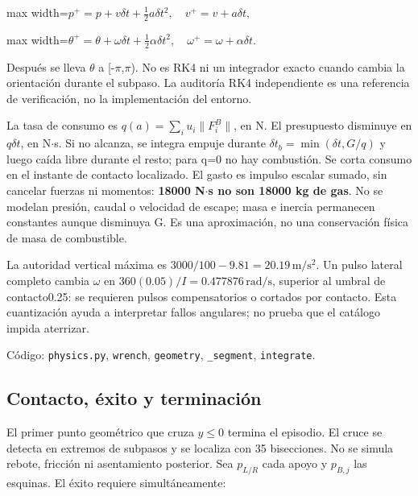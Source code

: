 \documentclass[12pt,a4paper]{article}
\begin{document}
\begin{center}\begin{adjustbox}{max width=\linewidth}$\displaystyle p^+=p+v\delta t+\tfrac12 a\delta t^2,\quad v^+=v+a\delta t,$\end{adjustbox}\end{center}


\begin{center}\begin{adjustbox}{max width=\linewidth}$\displaystyle \theta^+=\theta+\omega\delta t+\tfrac12\alpha\delta t^2,\quad
\omega^+=\omega+\alpha\delta t.$\end{adjustbox}\end{center}



Después se lleva \ensuremath{\theta} a [-\ensuremath{\pi},\allowbreak{}\ensuremath{\pi}). No es RK4 ni un integrador exacto cuando cambia la orientación durante el subpaso. La auditoría RK4 independiente es una referencia de verificación,\allowbreak{} no la implementación del entorno.


La tasa de consumo es $q(a)=\sum_i u_i\|F_i^B\|$,\allowbreak{} en N. El presupuesto disminuye en $q\delta t$,\allowbreak{} en N\ensuremath{\cdot}s. Si no alcanza,\allowbreak{} se integra empuje durante $\delta t_b=\min(\delta t,G/q)$ y luego caída libre durante el resto; para q=0 no hay combustión. Se corta consumo en el instante de contacto localizado. El gasto es impulso escalar sumado,\allowbreak{} sin cancelar fuerzas ni momentos: \textbf{18000 N\ensuremath{\cdot}s no son 18000 kg de gas}. No se modelan presión,\allowbreak{} caudal o velocidad de escape; masa e inercia permanecen constantes aunque disminuya G. Es una aproximación,\allowbreak{} no una conservación física de masa de combustible.


La autoridad vertical máxima es $3000/100-9.81=20.19\,\mathrm{m/s^2}$. Un pulso lateral completo cambia \ensuremath{\omega} en $360(0.05)/I=0.477876\,\mathrm{rad/s}$,\allowbreak{} superior al umbral de contacto0.25: se requieren pulsos compensatorios o cortados por contacto. Esta cuantización ayuda a interpretar fallos angulares; no prueba que el catálogo impida aterrizar.


Código: \textcolor{Accent}{\nolinkurl{physics.py}},\allowbreak{} \nolinkurl{wrench},\allowbreak{} \nolinkurl{geometry},\allowbreak{} \nolinkurl{_segment},\allowbreak{} \nolinkurl{integrate}.



\subsection{Contacto,\allowbreak{} éxito y terminación}
El primer punto geométrico que cruza $y\le0$ termina el episodio. El cruce se detecta en extremos de subpasos y se localiza con 35 bisecciones. No se simula rebote,\allowbreak{} fricción ni asentamiento posterior. Sea $p_{L/R}$ cada apoyo y $p_{B,j}$ las esquinas. El éxito requiere simultáneamente:
\end{document}
